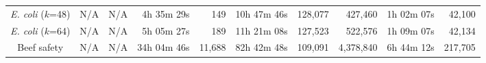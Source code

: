 \begin{table}
\begin{tabular}{@{}crrrrrrrrr@{}}
    \emph{E. coli} ($k$=48)         & N/A & N/A & 4h 35m 29s & 149 & 10h 47m 46s & 128,077 & 427,460 & 1h 02m 07s & 42,100 \\


    \emph{E. coli} ($k$=64)         & N/A & N/A & 5h 05m 27s & 189 & 11h 21m 08s & 127,523 & 522,576 & 1h 09m 07s & 42,134 \\

    Beef safety & N/A & N/A & 34h 04m 46s & 11,688 & 82h 42m 48s & 109,091 & 4,378,840 & 6h 44m 12s & 217,705 \\


\end{tabular}
\end{table}
